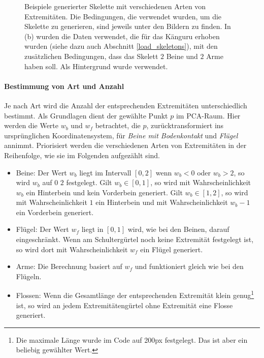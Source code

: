 \begin{figure}
 \caption{Beispiele generierter Skelette mit verschiedenen Arten von Extremitäten. Die Bedingungen, die verwendet wurden, um die Skelette zu generieren, sind jeweils unter den Bildern zu finden. In (b) wurden die Daten verwendet, die für das Känguru erhoben wurden (siehe dazu auch Abschnitt \ref{load_skeletons}), mit den zusätzlichen Bedingungen, dass das Skelett $2$ Beine und $2$ Arme haben soll. Als Hintergrund wurde \cite{background} verwendet.}
 \label{extremity_orientations}
\end{figure}



\paragraph{Bestimmung von Art und Anzahl}

Je nach Art wird die Anzahl der entsprechenden Extremitäten unterschiedlich bestimmt. Als Grundlagen dient der gewählte Punkt $p$ im PCA-Raum. Hier werden die Werte $w_b$ und $w_f$ betrachtet, die $p$, zurücktransformiert ins ursprünglichen Koordinatensystem, für \emph{Beine mit Bodenkontakt} und \emph{Flügel} annimmt. Priorisiert werden die verschiedenen Arten von Extremitäten in der Reihenfolge, wie sie im Folgenden aufgezählt sind.

\begin{itemize}
 \item Beine: Der Wert $w_b$ liegt im Intervall $[0, 2]$ \bzw wenn $w_b < 0$ oder $w_b > 2$, so wird $w_b$ auf $0$ \bzw $2$ festgelegt. Gilt $w_b \in [0, 1]$, so wird mit Wahrscheinlichkeit $w_b$ ein Hinterbein und kein Vorderbein generiert. Gilt $w_b \in [1, 2]$, so wird mit Wahrscheinlichkeit $1$ ein Hinterbein und mit Wahrscheinlichkeit $w_b - 1$ ein Vorderbein generiert.
 
 \item Flügel: Der Wert $w_f$ liegt in $[0, 1]$ \bzw wird, wie bei den Beinen, darauf eingeschränkt. Wenn am Schultergürtel noch keine Extremität festgelegt ist, so wird dort mit Wahrscheinlichkeit $w_f$ ein Flügel generiert.
 
 \item Arme: Die Berechnung basiert auf $w_f$ und funktioniert gleich wie bei den Flügeln.
 
 \item Flossen: Wenn die Gesamtlänge der entsprechenden Extremität klein genug\footnote{Die maximale Länge wurde im Code auf 200px festgelegt. Das ist aber ein beliebig gewählter Wert.} ist, so wird an jedem Extremitätengürtel ohne Extremität eine Flosse generiert.
\end{itemize}

